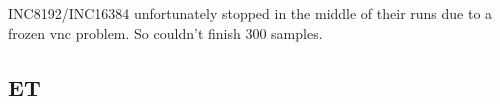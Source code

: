 INC8192/INC16384 unfortunately stopped in the middle of their runs due to a frozen vnc problem. So couldn't finish 300 samples.

\pagebreak

\subsection{ET}

\begin{figure}[hp!]
	\centering
\end{figure}
